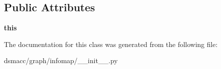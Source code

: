 \subsection*{Public Attributes}
\begin{DoxyCompactItemize}
\item 
\mbox{\label{classdsmacc_1_1graph_1_1infomap_1_1MemNetwork_a570e5ceb98f9b7d8d22a8ae7c3fa8c9a}} 
{\bfseries this}
\end{DoxyCompactItemize}


The documentation for this class was generated from the following file\+:\begin{DoxyCompactItemize}
\item 
dsmacc/graph/infomap/\+\_\+\+\_\+init\+\_\+\+\_\+.\+py\end{DoxyCompactItemize}
